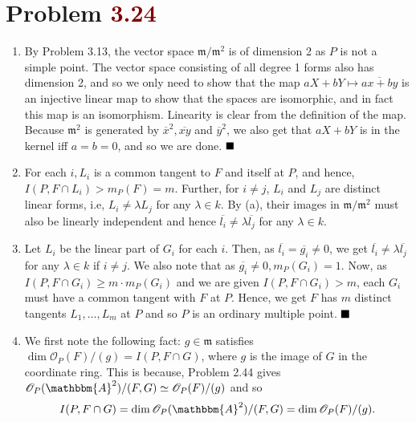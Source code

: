 \documentclass[12pt]{article}
\begin{document}
\section{Problem \textcolor{maroon}{3.24}}
\begin{enumerate}[label = (\alph*)]
    \item By Problem 3.13, the vector space \( \mathfrak{m}/\mathfrak{m}^2 \) is of dimension 2 as \( P \) is not a simple point. The vector space consisting of all degree 1 forms also has dimension 2, and so we only need to show that the map \( aX+bY \mapsto \overline{ax+by} \) is an injective linear map to show that the spaces are isomorphic, and in fact this map is an isomorphism. Linearity is clear from the definition of the map. Because \( \mathfrak{m}^2 \) is generated by \( \overline{x}^2, \overline{xy} \) and \( \overline{y}^2 \), we also get that \( aX+bY \) is in the kernel iff \( a=b=0 \), and so we are done. \(\hfill \blacksquare\)
          \smallskip

    \item For each \( i, L_i \) is a common tangent to \( F \) and itself at \( P \), and hence, \( I(P, F \cap L_i) > m_P(F) = m \). Further, for \( i \neq j \), \( L_i \) and \( L_j \) are distinct linear forms, i.e, \( L_i \neq \lambda L_j \) for any \( \lambda \in k \). By (a), their images in \( \mathfrak{m}/\mathfrak{m}^2 \) must also be linearly independent and hence \( \overline{l_i} \neq \lambda \overline{l_j} \) for any \( \lambda \in k \).
          \smallskip

    \item Let \( L_i \) be the linear part of \( G_i \) for each \( i \). Then, as \( \overline{l_i} = \overline{g_i} \neq 0 \), we get \( \overline{l_i} \neq \lambda\overline{l_j} \) for any \( \lambda \in k \) if \( i \neq j \). We also note that as \( \overline{g_i} \neq 0, m_P(G_i) = 1 \). Now, as \( I(P, F \cap G_i) \geq m \cdot m_P(G_i) \) and we are given \( I(P, F \cap G_i) > m \), each \( G_i \) must have a common tangent with \( F \) at \( P \). Hence, we get \( F \) has \( m \) distinct tangents \( L_1, \dots, L_m \) at \( P \) and so \( P \) is an ordinary multiple point. \(\hfill \blacksquare\)
          \smallskip

    \item We first note the following fact: \( g \in \mathfrak{m} \) satisfies \( \dim \mathscr{O}_P(F)/(g) = I(P, F \cap G) \), where \( g \) is the image of \( G \) in the coordinate ring. This is because, Problem 2.44 gives \( \mathscr{O}_P(\mathbbm{A}^2)/(F, G) \simeq \mathscr{O}_P(F)/(g) \) and so
          \[
              I(P, F \cap G) = \dim \mathscr{O}_P(\mathbbm{A}^2)/(F, G) = \dim \mathscr{O}_P(F)/(g).
          \]


\end{enumerate}
\end{document}
